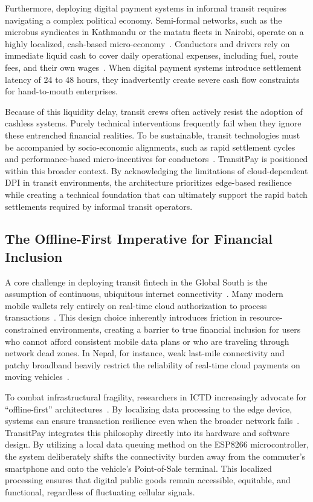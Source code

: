 \documentclass[manuscript,review,anonymous]{acmart}
\begin{document}
Furthermore, deploying digital payment systems in informal transit requires navigating a complex political economy. Semi-formal networks, such as the microbus syndicates in Kathmandu or the matatu fleets in Nairobi, operate on a highly localized, cash-based micro-economy~\cite{tamang_aryal_2024,oc_city_matatu_2020}. Conductors and drivers rely on immediate liquid cash to cover daily operational expenses, including fuel, route fees, and their own wages~\cite{nepal_ef_dp_2023}. When digital payment systems introduce settlement latency of 24 to 48 hours, they inadvertently create severe cash flow constraints for hand-to-mouth enterprises.


Because of this liquidity delay, transit crews often actively resist the adoption of cashless systems. Purely technical interventions frequently fail when they ignore these entrenched financial realities. To be sustainable, transit technologies must be accompanied by socio-economic alignments, such as rapid settlement cycles and performance-based micro-incentives for conductors~\cite{tamang_aryal_2024, nepal_ef_dp_2023}. TransitPay is positioned within this broader context. By acknowledging the limitations of cloud-dependent DPI in transit environments, the architecture prioritizes edge-based resilience while creating a technical foundation that can ultimately support the rapid batch settlements required by informal transit operators.

\subsection{The Offline-First Imperative for Financial Inclusion}
A core challenge in deploying transit fintech in the Global South is the assumption of continuous, ubiquitous internet connectivity~\cite{townsend2019distributed}. Many modern mobile wallets rely entirely on real-time cloud authorization to process transactions~\cite{townsend2019distributed,cgsb2021mobilewallets}. This design choice inherently introduces friction in resource-constrained environments, creating a barrier to true financial inclusion for users who cannot afford consistent mobile data plans or who are traveling through network dead zones. In Nepal, for instance, weak last-mile connectivity and patchy broadband heavily restrict the reliability of real-time cloud payments on moving vehicles~\cite{kharel2025digital}.


To combat infrastructural fragility, researchers in ICTD increasingly advocate for ``offline-first'' architectures~\cite{iyengar2024edge,umar2025offline}. By localizing data processing to the edge device, systems can ensure transaction resilience even when the broader network fails~\cite{iyengar2024edge}. TransitPay integrates this philosophy directly into its hardware and software design. By utilizing a local data queuing method on the ESP8266 microcontroller, the system deliberately shifts the connectivity burden away from the commuter's smartphone and onto the vehicle's Point-of-Sale terminal. This localized processing ensures that digital public goods remain accessible, equitable, and functional, regardless of fluctuating cellular signals.
\end{document}
